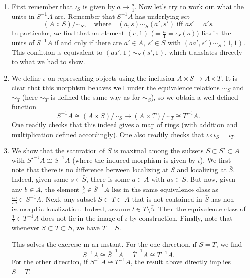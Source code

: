 \documentclass[a4paper,11pt]{article}
\begin{document}
\begin{enumerate}
    \item First remember that $\iota_S$ is given by $a \mapsto \frac a1$. 
        Now let's try to work out what the units in $S^{-1}A$ are. Remember that
        $S^{-1}A$ has underlying set 
        \begin{equation*}
            (A \times S) / \sim_S, \quad \text{where} \quad
            (a,s) \sim_S (a', s') \text{ iff } as' = a's. 
        \end{equation*}
        In particular, we find that an element $(a,1)$ ($=\frac a1 = \iota_S(a)$)
        lies in the units of
        $S^{-1}A$ if and only if there are $a' \in A$, $s' \in S$ with 
        $(a a', s') \sim_S (1,1)$. This condition is equivalent to
        $(a a', 1) \sim_S (s', 1)$, which translates directly to what we had to
        show. 

    \item We define $\iota$ on representing objects using the inclusion
        $A \times S \to A \times T$. It is clear that this morphism behaves well
        under the equivalence relations $\sim_S$ and $\sim_T$ (here $\sim_T$ is
        defined the same way as for $\sim_S$), so we obtain a well-defined function
        \begin{equation*}
            S^{-1}A \cong (A \times S)/\sim_S \to (A\times T)/\sim_T \cong T^{-1}A.
        \end{equation*}
        One readily checks that this indeed gives a map of rings (with
        addition and multiplication defined accordingly). One also readily checks 
        that $\iota \circ \iota_S = \iota_T$. 

    \item We show that the saturation of $S$ is maximal among the subsets $S
        \subset S' \subset A$ with $S'^{-1} A \cong S^{-1} A$ (where the induced 
        morphism is given by $\iota$). 
        We first note that there is no difference between localizing at $S$ and
        localizing at $\bar S$. Indeed, given some $s \in \bar S$, there is 
        some $a \in A$ with $as \in S$. But now, given any $b \in A$, the element 
        $\frac bs \in \bar S^{-1} A$ lies in the same equivalence class
        as $\frac{ba}{sa} \in S^{-1} A$. Next, any subset $S \subset T \subset A$
        that is not contained in $\bar S$ has non-isomorphic localization.
        Indeed, assume $t \in T \setminus \bar S$. Then the
        equivalence class of $\frac 1t \in T^{-1}A$ does not lie in the image
        of $\iota$ by construction. Finally, note that whenever
        $S \subset T \subset \bar S$, we have $\bar T = \bar S$. 
        
        This solves the exercise in an instant. For the one direction, if
        $\bar S = \bar T$, we find 
        \begin{equation*}
            S^{-1} A \cong \bar S^{-1} A = \bar T^{-1}A \cong T^{-1}A.
        \end{equation*}
        For the other direction, if $S^{-1} A \cong T^{-1} A$, the result above
        directly implies $\bar S = \bar T$. 
\end{enumerate}


\contactend
\end{document}
